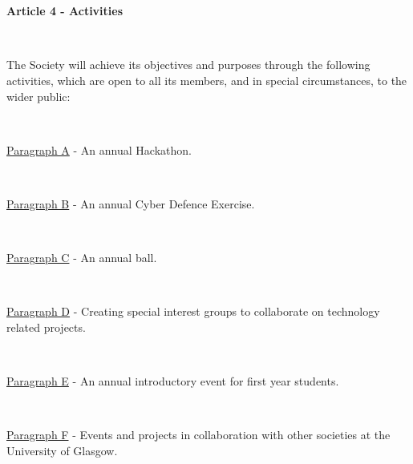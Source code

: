 ~

~

\large{\textbf{Article 4 - Activities}}

~

The Society will achieve its objectives and purposes through the
following activities, which are open to all its members, and in special
circumstances, to the wider public:



~

\underline{Paragraph A} - An annual Hackathon.

~

\underline{Paragraph B} - An annual Cyber Defence Exercise.

~

\underline{Paragraph C} - An annual ball.

~

\underline{Paragraph D} - Creating special interest groups to
collaborate on technology related projects.

~

\underline{Paragraph E} - An annual introductory event for first year
students.

~

\underline{Paragraph F} - Events and projects in collaboration with
other societies at the University of Glasgow.